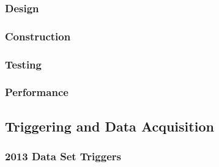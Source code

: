 \subsubsection{Design}
\subsubsection{Construction}
\subsubsection{Testing}
\subsubsection{Performance}
\subsection{Triggering and Data Acquisition}
\subsubsection{2013 Data Set Triggers}
